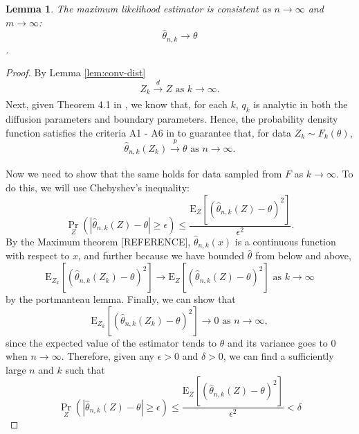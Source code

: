 \documentclass[10pt]{article}
\newtheorem{lemma}{Lemma}
\begin{document}
\begin{lemma}
  The maximum likelihood estimator is consistent as $n \to \infty$ and $m \to \infty$:
  \[ \hat{\theta}_{n,k} \to \theta \].
\end{lemma}
\begin{proof}
  By Lemma \ref{lem:conv-dist}
    \[ Z_k \xrightarrow[]{d} Z \mbox { as } k \to \infty. \] Next,
    given Theorem 4.1 in \cite{singler2008differentiability}, we know
    that, for each $k$, $q_k$ is analytic in both the diffusion
    parameters and boundary parameters. Hence, the probability density
    function satisfies the criteria A1 - A6 in
    \cite{casella2002statistical} to guarantee that, for data
    $Z_{k} \sim F_k(\theta)$,
    \[ \hat{\theta}_{n,k}(Z_k) \xrightarrow[]{p} \theta \mbox{ as } n
      \to \infty. \]

    Now we need to show that the same holds for data sampled from $F$
    as $k \to \infty$. To do this, we will use Chebyshev's inequality:
  \[
    \Pr_{Z}\left( \left| \hat{\theta}_{n,k}(Z) - \theta \right| \geq
      \epsilon \right) \leq \frac{ \mbox{E}_{Z}\left[
        (\hat{\theta}_{n,k}(Z) - \theta)^2 \right] }{ \epsilon^2 }.
  \]
  By the Maximum theorem [REFERENCE], $\hat{\theta}_{n,k}(x)$ is a continuous
  function with respect to $x$, and further because we have bounded
  $\hat{\theta}$ from below and above,
  \[
    \mbox{E}_{Z_k}\left[ (\hat{\theta}_{n,k}(Z_k) - \theta)^2 \right]
    \to \mbox{E}_{Z}\left[ (\hat{\theta}_{n,k}(Z) - \theta)^2 \right]
    \mbox{ as } k \to \infty
  \]
  by the portmanteau lemma. Finally, we can show that
  \begin{equation}
    \mbox{E}_{Z_k}\left[ (\hat{\theta}_{n,k}(Z_k) - \theta)^2 \right]
    \to 0 \mbox{ as } n \to \infty, \label{eq:var-lim}
  \end{equation}
  since the expected value of the estimator tends to $\theta$ and its
  variance goes to 0 when $n \to \infty$. Therefore, given any
  $\epsilon > 0$ and $\delta > 0$, we can find a sufficiently large
  $n$ and $k$ such that
  \[
    \Pr_{Z}\left( \left| \hat{\theta}_{n,k}(Z) - \theta \right| \geq
      \epsilon \right) \leq \frac{ \mbox{E}_{Z}\left[
        (\hat{\theta}_{n,k}(Z) - \theta)^2 \right] }{ \epsilon^2 } < \delta    
  \]
\end{proof}
\end{document}
